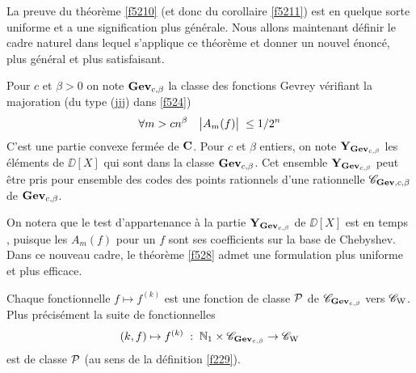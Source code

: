 La preuve du théorème \ref{f5210} (et donc du corollaire \ref{f5211}) est en 
quelque sorte uniforme et a une signification plus générale. Nous allons 
maintenant définir le cadre naturel dans lequel s'applique ce théorème et donner un nouvel énoncé, plus général et plus satisfaisant.

\begin{fdefinition} \label{f5212}
Pour  $c$ et $\beta > 0$  on note ${\bf Gev}_{c, \beta}$ la classe des fonctions 
Gevrey vérifiant la majoration (du type (jjj) dans \ref{f524})
$$ \forall m > cn^{\beta} \quad  \big|{A_m(f)}\big|\;  \leq 1/2^n$$
C'est une partie convexe fermée de ${\bf C}$.   
Pour  $c$ et $\beta$  entiers, on note  ${\bf Y}_{{\bf Gev}_{c, \beta}}$  les éléments de  $\DD[X]$  qui sont dans la classe  ${\bf Gev}_{c, \beta}$. 
Cet ensemble ${\bf Y}_{{\bf Gev}_{c, \beta}}$  peut être pris 
pour ensemble des codes des points rationnels d'une \pres rationnelle ${{\mathscr C}}_{{\bf Gev}, c, \beta}$  de ${\bf Gev}_{c, \beta}$.
\end{fdefinition}

On notera que le test d'appartenance à la partie ${\bf Y}_{{\bf Gev}_{c, \beta}}$  de  
$\DD[X]$   est en temps \poll, puisque les $A_m(f)$ pour un \pol $f$ 
sont ses coefficients sur la base de Chebyshev.
Dans ce nouveau cadre, le théorème \ref{f528} admet une formulation plus 
uniforme et plus efficace.

\begin{ftheorem} \label{f5213}
Chaque fonctionnelle $f \mapsto f^{(k)}$  est une fonction \uni de classe  ${\cal P}$   
de ${{\mathscr C}}_{{\bf Gev}_{c, \beta}}$ vers  ${{{\mathscr C}}_{\rm W}}$.   Plus précisément la suite de 
fonctionnelles 
$$ (k,f) \mapsto f^{(k)} \; : \; \mathbb {N}_1 \times {{\mathscr C}}_{{\bf Gev}_{c, \beta}} \rightarrow 
{{{\mathscr C}}_{\rm W}} $$
est \uni de classe  ${\cal P}$   (au sens de la définition \ref{f229}).
\end{ftheorem}

